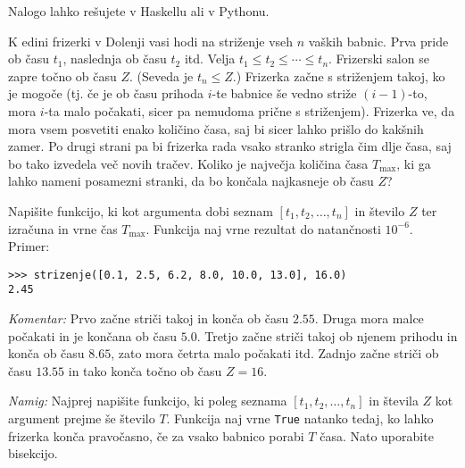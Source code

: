 \documentclass[arhiv]{../izpit}
\begin{document}



Nalogo lahko rešujete v Haskellu ali v Pythonu.

\vspace{0.5\baselineskip}\noindent
K edini frizerki v Dolenji vasi hodi na striženje vseh $n$ vaških babnic. Prva pride ob času $t_1$, naslednja ob času $t_2$ itd.
Velja $t_1 \leq t_2 \leq \cdots \leq t_n$. Frizerski salon se zapre točno ob času $Z$. (Seveda je $t_n \leq Z$.) Frizerka začne s striženjem takoj, ko je mogoče
(tj. če je ob času prihoda $i$-te babnice še vedno striže $(i-1)$-to, mora $i$-ta malo počakati, sicer pa nemudoma prične s striženjem).
Frizerka ve, da mora vsem posvetiti
enako količino časa, saj bi sicer lahko prišlo do kakšnih zamer. Po drugi strani pa bi frizerka rada vsako stranko strigla čim
dlje časa, saj bo tako izvedela več novih tračev. Koliko je največja količina časa $T_\mathrm{max}$, ki ga lahko nameni posamezni
stranki, da bo končala najkasneje ob času $Z$?

\vspace{0.5\baselineskip}\noindent
Napišite funkcijo, ki kot argumenta dobi seznam $[t_1, t_2, \ldots, t_n]$ in število $Z$ ter izračuna in vrne čas $T_\mathrm{max}$.
Funkcija naj vrne rezultat do natančnosti $10^{-6}$. Primer:

\begin{verbatim}>>> strizenje([0.1, 2.5, 6.2, 8.0, 10.0, 13.0], 16.0)
2.45
\end{verbatim}

\noindent
\textit{Komentar:} Prvo začne striči takoj in konča ob času $2.55$. Druga mora malce počakati in je končana ob času $5.0$. Tretjo začne striči takoj
ob njenem prihodu
in konča ob času $8.65$, zato mora četrta malo počakati itd. Zadnjo začne striči ob času $13.55$ in tako konča točno ob času $Z = 16$.

\vspace{0.5\baselineskip}\noindent
\textit{Namig:} Najprej napišite funkcijo, ki poleg seznama $[t_1, t_2, \ldots, t_n]$ in števila $Z$ kot argument prejme še število $T$.
Funkcija naj vrne \verb+True+ natanko tedaj, ko lahko frizerka konča pravočasno, če za vsako babnico porabi $T$ časa. Nato uporabite bisekcijo.
\end{document}

